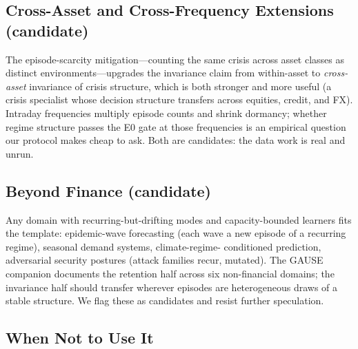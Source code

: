 \documentclass[10pt]{article}
\begin{document}
\subsection{Cross-Asset and Cross-Frequency Extensions (candidate)}

The episode-scarcity mitigation---counting the same crisis across asset
classes as distinct environments---upgrades the invariance claim from
within-asset to \emph{cross-asset} invariance of crisis structure, which
is both stronger and more useful (a crisis specialist whose decision
structure transfers across equities, credit, and FX). Intraday
frequencies multiply episode counts and shrink dormancy; whether regime
structure passes the E0 gate at those frequencies is an empirical
question our protocol makes cheap to ask. Both are candidates: the data
work is real and unrun.

\subsection{Beyond Finance (candidate)}

Any domain with recurring-but-drifting modes and capacity-bounded
learners fits the template: epidemic-wave forecasting (each wave a new
episode of a recurring regime), seasonal demand systems, climate-regime-%
conditioned prediction, adversarial security postures (attack families
recur, mutated). The GAUSE companion documents the retention half across
six non-financial domains; the invariance half should transfer wherever
episodes are heterogeneous draws of a stable structure. We flag these as
candidates and resist further speculation.

\subsection{When Not to Use It}
\label{sec:whennot}
\end{document}
